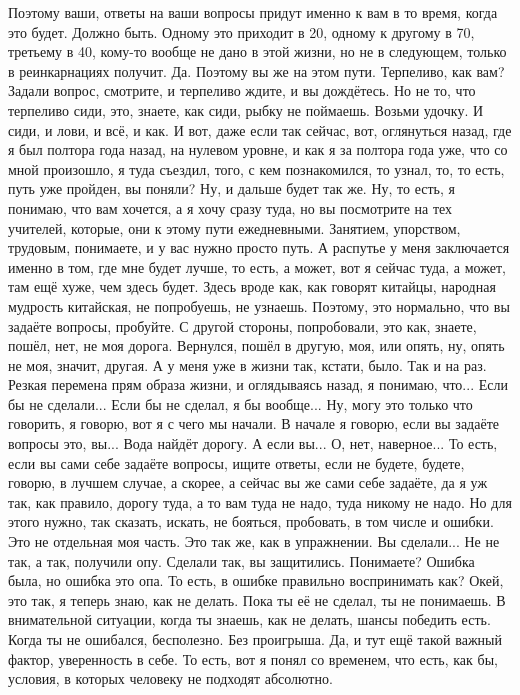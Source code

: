 Поэтому ваши, ответы на ваши вопросы придут именно к вам в то время, когда это будет.
Должно быть.
Одному это приходит в 20, одному к другому в 70, третьему в 40, кому-то вообще не дано в этой жизни, но не в следующем, только в реинкарнациях получит.
Да.
Поэтому вы же на этом пути.
Терпеливо, как вам?
Задали вопрос, смотрите, и терпеливо ждите, и вы дождётесь.
Но не то, что терпеливо сиди, это, знаете, как сиди, рыбку не поймаешь.
Возьми удочку.
И сиди, и лови, и всё, и как.
И вот, даже если так сейчас, вот, оглянуться назад, где я был полтора года назад, на нулевом уровне, и как я за полтора года уже, что со мной произошло, я туда съездил, того, с кем познакомился, то узнал, то, то есть, путь уже пройден, вы поняли?
Ну, и дальше будет так же.
Ну, то есть, я понимаю, что вам хочется, а я хочу сразу туда, но вы посмотрите на тех учителей, которые, они к этому пути ежедневными.
Занятием, упорством, трудовым, понимаете, и у вас нужно просто путь.
А распутье у меня заключается именно в том, где мне будет лучше, то есть, а может, вот я сейчас туда, а может, там ещё хуже, чем здесь будет.
Здесь вроде как, как говорят китайцы, народная мудрость китайская, не попробуешь, не узнаешь.
Поэтому, это нормально, что вы задаёте вопросы, пробуйте.
С другой стороны, попробовали, это как, знаете, пошёл, нет, не моя дорога.
Вернулся, пошёл в другую, моя, или опять, ну, опять не моя, значит, другая.
А у меня уже в жизни так, кстати, было.
Так и на раз.
Резкая перемена прям образа жизни, и оглядываясь назад, я понимаю, что...
Если бы не сделали...
Если бы не сделал, я бы вообще...
Ну, могу это только что говорить, я говорю, вот я с чего мы начали.
В начале я говорю, если вы задаёте вопросы это, вы...
Вода найдёт дорогу.
А если вы...
О, нет, наверное...
То есть, если вы сами себе задаёте вопросы, ищите ответы, если не будете, будете, говорю, в лучшем случае, а скорее, а сейчас вы же сами себе задаёте, да я уж так, как правило, дорогу туда, а то вам туда не надо, туда никому не надо.
Но для этого нужно, так сказать, искать, не бояться, пробовать, в том числе и ошибки.
Это не отдельная моя часть.
Это так же, как в упражнении.
Вы сделали...
Не не так, а так, получили опу.
Сделали так, вы защитились.
Понимаете?
Ошибка была, но ошибка это опа.
То есть, в ошибке правильно воспринимать как?
Окей, это так, я теперь знаю, как не делать.
Пока ты её не сделал, ты не понимаешь.
В внимательной ситуации, когда ты знаешь, как не делать, шансы победить есть.
Когда ты не ошибался, бесполезно.
Без проигрыша.
Да, и тут ещё такой важный фактор, уверенность в себе.
То есть, вот я понял со временем, что есть, как бы, условия, в которых человеку не подходят абсолютно.
